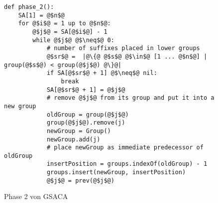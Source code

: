 \begin{figure}
\begin{verbatim}
def phase_2():
	SA[1] = @$n$@ 
	for @$i$@ = 1 up to @$n$@:
		@$j$@ = SA[@$i$@] - 1 
		while @$j$@ @$\neq$@ 0:
			# number of suffixes placed in lower groups
			@$sr$@ =  |@\{@ @$s$@ @$\in$@ [1 ... @$n$@] | group(@$s$@) < group(@$j$@) @\}@|
			if SA[@$sr$@ + 1] @$\neq$@ nil: 
				break
			SA[@$sr$@ + 1] = @$j$@
			# remove @$j$@ from its group and put it into a new group
			oldGroup = group(@$j$@)
			group(@$j$@).remove(j)
			newGroup = Group()
			newGroup.add(j)
			# place newGroup as immediate predecessor of oldGroup
			insertPosition = groups.indexOf(oldGroup) - 1
			groups.insert(newGroup, insertPosition)
			@$j$@ = prev(@$j$@)
\end{verbatim}
\caption[Phase 2 von GSACA]{Phase 2 von GSACA}
\label{saca:3:code_2}
\end{figure}